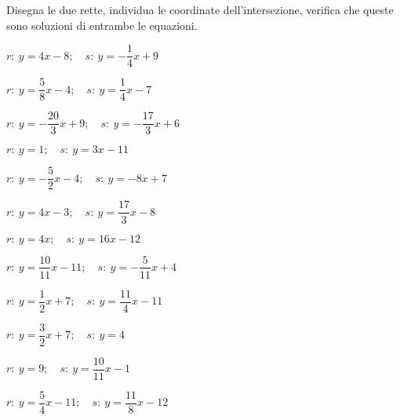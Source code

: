 \begin{esercizio}\label{ese:}
 Disegna le due rette, individua le 
coordinate dell'intersezione, verifica che queste sono soluzioni di 
entrambe le equazioni.
 \begin{multicols}{2}
 \begin{enumeratea}
  \item  \(r:~y = 4 x -8; \quad s:~y = -\dfrac{1}{4} x +9\)
  \item  \(r:~y = \dfrac{5}{8} x -4; \quad s:~y = \dfrac{1}{4} x -7\)
  \item  \(r:~y = -\dfrac{20}{3} x +9; \quad s:~y = -\dfrac{17}{3} x +6\)
  \item  \(r:~y = 1;\quad s:~y = 3 x -11\)
  \item  \(r:~y = -\dfrac{5}{2} x -4; \quad s:~y = -8 x +7\)
  \item  \(r:~y = 4 x -3; \quad s:~y = \dfrac{17}{3} x -8\)
  \item  \(r:~y = 4 x ; \quad s:~y = 16 x -12\)
  \item  \(r:~y = \dfrac{10}{11} x -11; \quad s:~y = -\dfrac{5}{11} x +4\)
  \item  \(r:~y = \dfrac{1}{2} x +7; \quad s:~y = \dfrac{11}{4} x -11\)
  \item  \(r:~y = \dfrac{3}{2} x +7; \quad s:~y = 4\)
  \item  \(r:~y = 9; \quad s:~y = \dfrac{10}{11} x -1\)
  \item  \(r:~y = \dfrac{5}{4} x -11; \quad s:~y = \dfrac{11}{8} x -12\)
 \end{enumeratea}
 \end{multicols}
\end{esercizio}

